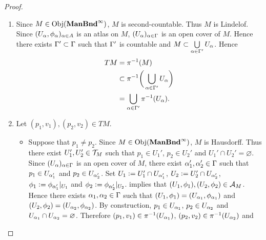 \documentclass{book}
\begin{document}
\begin{proof}
\begin{enumerate}[label=(\alph*)]
\begin{align*}
		\end{align*}
		Since $(U_{\al}, \phi_{\al}), (U_{\be}, \phi_{\be}) \in \MA_M$, we have that $(U_{\al}, \phi_{\al}), (U_{\be}, \phi_{\be})$ are smoothly compatible. Hence $\phi_{\be} \circ \phi_{\al}|^{-1}_{U_{\al} \cap U_{\be}}$ is smooth. In particular, for each $k \in [n]$, $y^k \circ \phi|_{U_{\al} \cap U_{\be}}^{-1}$ is smooth. By definition, for each $a \in \phi_{\al}(U_{\al} \cap U_{\be})$ and $j,k \in [n]$, we have that $\frac{\p y^k}{\p x^j}(\phi_{\al}^{-1}(a)) = \frac{\p}{\p u^j} [y^k \circ \phi_{\al}|_{U_{\al} \cap U_{\be}}^{-1}](a)$. Hence for each $j,k \in [n]$, $\frac{\p y^k}{\p x^j} \circ \phi_{\al}|_{U_{\al} \cap U_{\be}}^{-1}$ is smooth. Thus $\tl{\phi}_{\be}|_{\pi^{-1}(U_{\al}) \cap \pi^{-1}(U_{\be})} \circ \tl{\phi}_{\al}|_{\pi^{-1}(U_{\al}) \cap \pi^{-1}(U_{\be})}^{-1}$ is smooth.
		\item Since $M \in \operatorname{Obj}(\operatorname*{\text{\textbf{ManBnd}}^{\infty}})$, $M$ is second-countable. Thus $M$ is Lindelof. Since $(U_{\alpha}, \phi_{\alpha})_{\alpha \in A}$ is an atlas on $M$, $(U_{\alpha})_{\alpha \in \Gamma}$ is an open cover of $M$. Hence there exists $\Gamma' \subset \Gamma$ such that $\Gamma'$ is countable and $M \subset \bigcup\limits_{\alpha \in \Gamma'} U_{\alpha}$. Hence 
		\begin{align*}
			TM
			& = \pi^{-1}(M) \\
			& \subset \pi^{-1} \bigg( \bigcup\limits_{\alpha \in \Gamma'} U_{\alpha} \bigg) \\
			& = \bigcup\limits_{\alpha \in \Gamma'} \pi^{-1}(U_{\alpha}).
		\end{align*}
		\item Let $(p_1, v_1), (p_2, v_2) \in TM$. 
		\begin{itemize}
			\item Suppose that $p_1 \neq p_2$. Since $M \in \operatorname{Obj}(\operatorname*{\text{\textbf{ManBnd}}^{\infty}})$, $M$ is Hausdorff. Thus there exist $U_1', U_2' \in \mathcal{T}_M$ such that $p_1 \in U_1'$, $p_2 \in U_2'$ and $U_1' \cap U_2' = \varnothing$. Since $(U_{\alpha})_{\alpha \in \Gamma}$ is an open cover of $M$, there exist $\alpha_1', \alpha_2' \in \Gamma$ such that $p_1 \in U_{\alpha_1'}$ and $p_2 \in U_{\alpha_2'}$. Set $U_1 \vcentcolon= U_1' \cap U_{\alpha_1'}$, $U_2 \vcentcolon= U_2' \cap U_{\alpha_2'}$, $\phi_1 \vcentcolon= \phi_{\alpha_1'}|_{U_1}$ and $\phi_2 \vcentcolon= \phi_{\alpha_2'}|_{U_2}$.   implies that $(U_1, \phi_1), (U_2, \phi_2) \in \mathcal{A}_M$. Hence there exists $\alpha_1, \alpha_2 \in \Gamma$ such that $(U_1, \phi_1) = (U_{\alpha_1}, \phi_{\alpha_1})$ and $(U_2, \phi_2) = (U_{\alpha_2}, \phi_{\alpha_2})$. By construction, $p_1 \in U_{\alpha_1}$, $p_2 \in U_{\alpha_2}$ and $U_{\alpha_1} \cap U_{\alpha_2} = \varnothing$. Therefore $(p_1, v_1) \in \pi^{-1}(U_{\alpha_1})$, $(p_2, v_2) \in \pi^{-1}(U_{\alpha_2})$ and 

\end{itemize}
\end{enumerate}
\end{proof}
\end{document}
